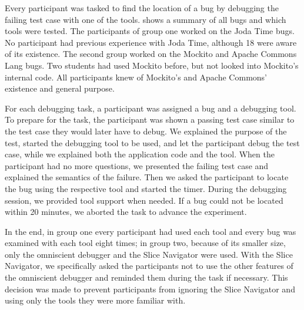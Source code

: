 Every participant was tasked to find the location of a bug by debugging the failing test case with one of the tools.
 shows a summary of all bugs and which tools were tested.
The participants of group one worked on the Joda Time bugs.
No participant had previous experience with Joda Time, although 18 were aware of its existence.
The second group worked on the Mockito and Apache Commons Lang bugs.
Two students had used Mockito before, but not looked into Mockito's internal code.
All participants knew of Mockito's and Apache Commons' existence and general purpose.

For each debugging task, a participant was assigned a bug and a debugging tool.
To prepare for the task, the participant was shown a passing test case similar to the test case they would later have to debug.
We explained the purpose of the test, started the debugging tool to be used,
and let the participant debug the test case, while we explained both the application code and the tool.
When the participant had no more questions, we presented the failing test case and explained the semantics of the failure.
Then we asked the participant to locate the bug using the respective tool and started the timer.
During the debugging session, we provided tool support when needed.
If a bug could not be located within 20 minutes, we aborted the task to advance the experiment.

In the end, in group one every participant had used each tool and every bug was examined with each tool eight times; in group two, because of its smaller size, only the omniscient debugger and the Slice Navigator were used.
With the Slice Navigator, we specifically asked the participants not to use the other features of the omniscient debugger and reminded them during the task if necessary.
This decision was made to prevent participants from ignoring the Slice Navigator and using only the tools they were more familiar with.



